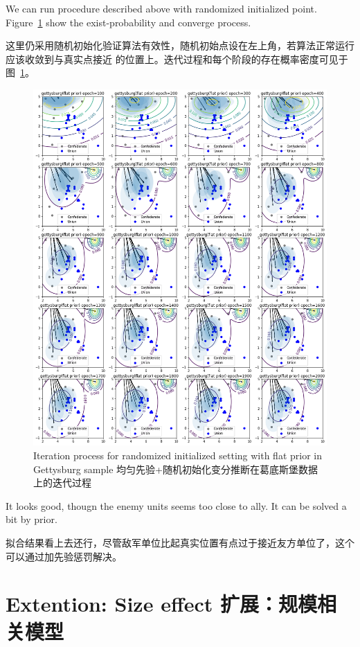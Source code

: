 \documentclass{article}
\begin{document}
We can run procedure described above with randomized initialized point. 
Figure~\ref{fig:gettysburgInit} show the exist-probability and converge process.

这里仍采用随机初始化验证算法有效性，随机初始点设在左上角，若算法正常运行应该收敛到与真实点接近
的位置上。迭代过程和每个阶段的存在概率密度可见于图~\ref{fig:gettysburgInit}。

\begin{figure}[ht]
\includegraphics[width=0.99\linewidth]{gettysburg-init.png}
\caption{Iteration process for randomized initialized setting with flat prior in Gettysburg sample
均匀先验+随机初始化变分推断在葛底斯堡数据上的迭代过程}
\label{fig:gettysburgInit}
\end{figure}

It looks good, thougn the enemy units seems too close to ally. It can be solved a bit by prior.

拟合结果看上去还行，尽管敌军单位比起真实位置有点过于接近友方单位了，这个可以通过加先验惩罚解决。


\section{Extention: Size effect 扩展：规模相关模型}
\end{document}
